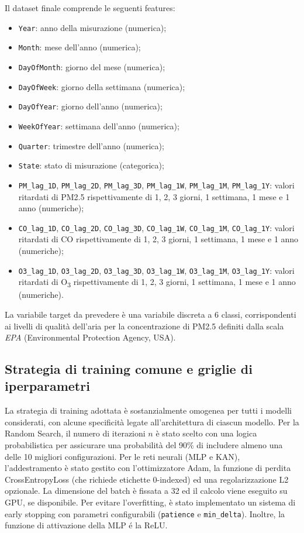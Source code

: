 \documentclass[a4paper,12pt]{report}
\begin{document}
	Il dataset finale comprende le seguenti features:
	\begin{itemize}
		\item \texttt{Year}: anno della misurazione (numerica);
		\item \texttt{Month}: mese dell’anno (numerica);
		\item \texttt{DayOfMonth}: giorno del mese (numerica);
		\item \texttt{DayOfWeek}: giorno della settimana (numerica);
		\item \texttt{DayOfYear}: giorno dell’anno (numerica);
		\item \texttt{WeekOfYear}: settimana dell’anno (numerica);
		\item \texttt{Quarter}: trimestre dell’anno (numerica);
		\item \texttt{State}: stato di misurazione (categorica);
		\item \texttt{PM\_lag\_1D}, \texttt{PM\_lag\_2D}, \texttt{PM\_lag\_3D}, \texttt{PM\_lag\_1W}, \texttt{PM\_lag\_1M}, \texttt{PM\_lag\_1Y}: valori ritardati di PM2.5 rispettivamente di 1, 2, 3 giorni, 1 settimana, 1 mese e 1 anno (numeriche);
		\item \texttt{CO\_lag\_1D}, \texttt{CO\_lag\_2D}, \texttt{CO\_lag\_3D}, \texttt{CO\_lag\_1W}, \texttt{CO\_lag\_1M}, \texttt{CO\_lag\_1Y}: valori ritardati di CO rispettivamente di 1, 2, 3 giorni, 1 settimana, 1 mese e 1 anno (numeriche);
		\item \texttt{O3\_lag\_1D}, \texttt{O3\_lag\_2D}, \texttt{O3\_lag\_3D}, \texttt{O3\_lag\_1W}, \texttt{O3\_lag\_1M}, \texttt{O3\_lag\_1Y}: valori ritardati di O\textsubscript{3} rispettivamente di 1, 2, 3 giorni, 1 settimana, 1 mese e 1 anno (numeriche).
	\end{itemize}
	
	La variabile target da prevedere è una variabile discreta a 6 classi, corrispondenti ai livelli di qualità dell’aria per la concentrazione di PM2.5 definiti dalla scala \textit{EPA} (Environmental Protection Agency, USA).
	
	\subsection{Strategia di training comune e griglie di iperparametri}
	La strategia di training adottata è sostanzialmente omogenea per tutti i modelli considerati, con alcune specificità legate all'architettura di ciascun modello. Per la Random Search, il numero di iterazioni $n$ è stato scelto con una logica probabilistica per assicurare una probabilità del 90\% di includere almeno una delle 10 migliori configurazioni. Per le reti neurali (MLP e KAN), l'addestramento è stato gestito con l'ottimizzatore Adam, la funzione di perdita CrossEntropyLoss (che richiede etichette 0-indexed) ed una regolarizzazione L2 opzionale. La dimensione del batch è fissata a 32 ed il calcolo viene eseguito su GPU, se disponibile. Per evitare l'overfitting, è stato implementato un sistema di early stopping con parametri configurabili (\texttt{patience} e \texttt{min\_delta}). Inoltre, la funzione di attivazione della MLP é la ReLU. \\
	
\end{document}
